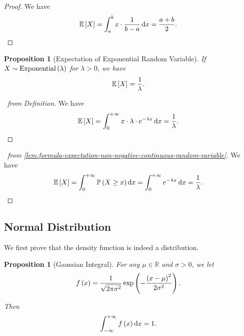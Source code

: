 \documentclass{article}
\newtheorem{proposition}[theorem]{Proposition}
\theoremstyle{definition}
\theoremstyle{remark}
\newcommand{\RR}{\mathbb{R}}
\newcommand{\Prob}{\mathbb{P}}
\newcommand{\Expt}{\mathbb{E}}
\newcommand{\plusinfty}{+\infty}
\newcommand{\minusinfty}{-\infty}
\newcommand{\Exponential}{\operatorname{Exponential}}
\begin{document}
\begin{proof}
    We have
    \[
        \Expt\bqty{X} = \int_{a}^{b} x \cdot \frac{1}{b - a} \dd{x} = \frac{a + b}{2}.
    \]
\end{proof}

\begin{proposition}[Expectation of Exponential Random Variable]
    \label{prop:expt-exponential}%
    If \(X \sim \Exponential\pqty{\lambda}\) for \(\lambda > 0\), we have
    \[
        \Expt\bqty{X} = \frac{1}{\lambda}.
    \]
\end{proposition}

\begin{proof}[\proofname\ from Definition]
    We have
    \[
        \Expt\bqty{X} = \int_{0}^{\plusinfty} x \cdot \lambda \cdot e^{-\lambda x} \dd{x} = \frac{1}{\lambda}.
    \]
\end{proof}

\begin{proof}[\proofname\ from \autoref{lem:formula-expectation-non-negative-continuous-random-variable}]
    We have
    \[
        \Expt\bqty{X} = \int_{0}^{\plusinfty} \Prob\pqty{X \geq x} \dd{x} = \int_{0}^{\plusinfty} e^{-\lambda x} \dd{x} = \frac{1}{\lambda}.
    \]
\end{proof}

\subsection{Normal Distribution}

We first prove that the density function is indeed a distribution.

\begin{proposition}[Gaussian Integral]
    \label{prop:gaussian-integral}%
    For any \(\mu \in \RR\) and \(\sigma > 0\), we let
    \[
        f\left(x\right) = \frac{1}{\sqrt{2 \pi \sigma^2}} \exp\left(-\frac{\left(x - \mu\right)^2}{2 \sigma^2}\right).
    \]

    Then
    \[
        \int_{\minusinfty}^{\plusinfty} f\pqty{x} \dd{x} = 1.
    \]
\end{proposition}
\end{document}
